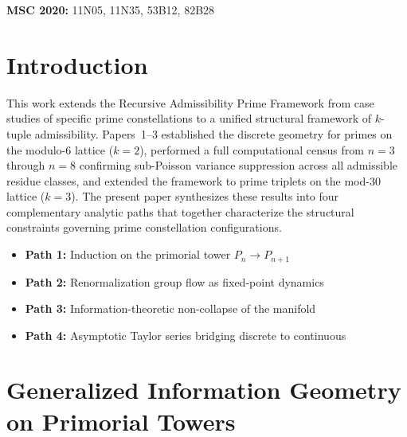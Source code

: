 \documentclass[11pt]{article}
\theoremstyle{remark}
\begin{document}
\noindent \textbf{MSC 2020:} 11N05, 11N35, 53B12, 82B28

\section{Introduction}

This work extends the Recursive Admissibility Prime Framework from
case studies of specific prime constellations to a unified structural framework
of $k$-tuple admissibility. Papers~1--3 established the discrete geometry
for primes on the modulo-6 lattice ($k=2$), performed a full computational
census from $n=3$ through $n=8$ confirming sub-Poisson variance suppression
across all admissible residue classes, and extended the framework to prime
triplets on the mod-30 lattice ($k=3$). The present paper synthesizes
these results into four complementary analytic paths that together characterize
the structural constraints governing prime constellation configurations.

\begin{itemize}
    \item \textbf{Path 1:} Induction on the primorial tower $P_n \to P_{n+1}$
    \item \textbf{Path 2:} Renormalization group flow as fixed-point dynamics
    \item \textbf{Path 3:} Information-theoretic non-collapse of the manifold
    \item \textbf{Path 4:} Asymptotic Taylor series bridging discrete to continuous
\end{itemize}

\section{Generalized Information Geometry on Primorial Towers}
\end{document}
